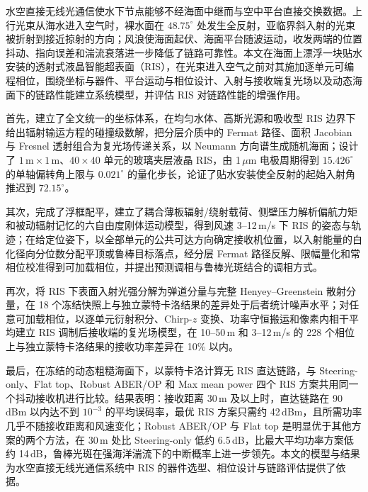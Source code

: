 \begin{chineseabstract}
水空直接无线光通信使水下节点能够不经海面中继而与空中平台直接交换数据。上行光束从海水进入空气时，裸水面在 $48.75^\circ$ 处发生全反射，亚临界斜入射的光束被折射到接近掠射的方向；风浪使海面起伏、海面平台随波运动，收发两端的位置抖动、指向误差和湍流衰落进一步降低了链路可靠性。本文在海面上漂浮一块贴水安装的透射式液晶智能超表面（RIS），在光束进入空气之前对其施加逐单元可编程相位，围绕坐标与器件、平台运动与相位设计、入射与接收端复光场以及动态海面下的链路性能建立系统模型，并评估 RIS 对链路性能的增强作用。

首先，建立了全文统一的坐标体系，在均匀水体、高斯光源和吸收型 RIS 边界下给出辐射输运方程的碰撞级数解，把分层介质中的 Fermat 路径、面积 Jacobian 与 Fresnel 透射组合为复光场传递关系，以 Neumann 方向谱生成随机海面；设计了 $1\,\mathrm m\times1\,\mathrm m$、$40\times40$ 单元的玻璃夹层液晶 RIS，由 1\,$\mu$m 电极周期得到 $15.426^\circ$ 的单轴偏转角上限与 $0.021^\circ$ 的量化步长，论证了贴水安装使全反射的起始入射角推迟到 $72.15^\circ$。

其次，完成了浮框配平，建立了耦合薄板辐射/绕射载荷、侧壁压力解析偏航力矩和被动辐射记忆的六自由度刚体运动模型，得到风速 3--12\,m/s 下 RIS 的姿态与轨迹；在给定位姿下，以全部单元的公共可达方向确定接收机位置，以入射能量的白化径向分位数分配平顶或鲁棒目标落点，经分层 Fermat 路径反解、限幅量化和常相位校准得到可加载相位，并提出预测调相与鲁棒光斑结合的调相方式。

再次，将 RIS 下表面入射光强分解为弹道分量与完整 Henyey--Greenstein 散射分量，在 18 个冻结快照上与独立蒙特卡洛结果的差异处于后者统计噪声水平；对任意可加载相位，以逐单元衍射积分、Chirp-$z$ 变换、功率守恒搬运和像素内相干平均建立 RIS 调制后接收端的复光场模型，在 10--50\,m 和 3--12\,m/s 的 228 个相位上与独立蒙特卡洛结果的接收功率差异在 10\% 以内。

最后，在冻结的动态粗糙海面下，以蒙特卡洛计算无 RIS 直达链路，与 Steering-only、Flat top、Robust ABER/OP 和 Max mean power 四个 RIS 方案共用同一个抖动接收机进行比较。结果表明：接收距离 30\,m 及以上时，直达链路在 90\,dBm 以内达不到 $10^{-3}$ 的平均误码率，最优 RIS 方案只需约 42\,dBm，且所需功率几乎不随接收距离和风速变化；Robust ABER/OP 与 Flat top 是明显优于其他方案的两个方法，在 30\,m 处比 Steering-only 低约 6.5\,dB，比最大平均功率方案低约 14\,dB，鲁棒光斑在强海洋湍流下的中断概率上进一步领先。本文的模型与结果为水空直接无线光通信系统中 RIS 的器件选型、相位设计与链路评估提供了依据。

\end{chineseabstract}
